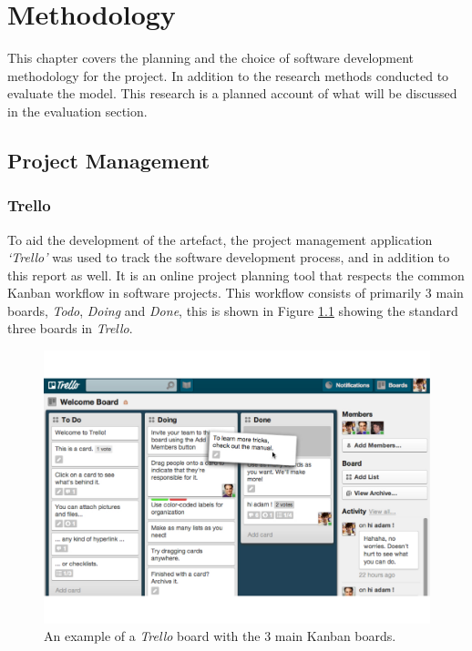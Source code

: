 \documentclass[report, 11pt, oneside]{dissertation}
\begin{document}
\chapter{Methodology} \label{chap:methodology}

This chapter covers the planning and the choice of software development methodology for the project. In addition to the research methods conducted to evaluate the model. This research is a planned account of what will be discussed in the evaluation section.

\section{Project Management}

\subsection{Trello}

To aid the development of the artefact, the project management application \textit{`Trello'} was used to track the software development process, and in addition to this report as well. It is an online project planning tool that respects the common Kanban workflow in software projects. This workflow consists of primarily 3 main boards, \textit{Todo}, \textit{Doing} and \textit{Done}, this is shown in Figure \ref{fig:trello} showing the standard three boards in \textit{Trello}.

 \begin{figure}[!htb]
	\centering
	\includegraphics[scale=0.45]{figure_17.pdf}
	\caption[\textit{Trello} Board.]{An example of a \textit{Trello} board with the 3 main Kanban boards.}
	\label{fig:trello}
\end{figure}
\end{document}
